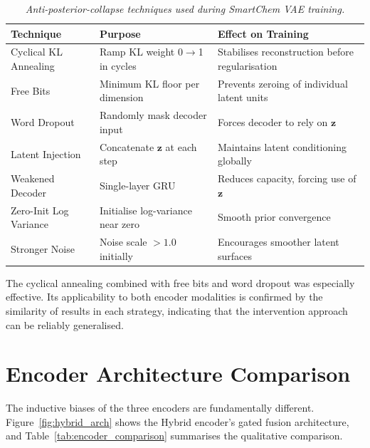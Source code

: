 \documentclass[12pt,a4paper]{report}
\begin{document}
\begin{table}[htbp]
\centering
\small
\caption{\textit{Anti-posterior-collapse techniques used during SmartChem VAE training.}}
\label{tab:anti_collapse}
\begin{tabular}{p{3.4cm}p{4.2cm}p{4.8cm}}
\hline
\textbf{Technique} & \textbf{Purpose} & \textbf{Effect on Training} \\
\hline
Cyclical KL Annealing    & Ramp KL weight 0$\to$1 in cycles
                         & Stabilises reconstruction before regularisation \\[4pt]
Free Bits                & Minimum KL floor per dimension
                         & Prevents zeroing of individual latent units \\[4pt]
Word Dropout             & Randomly mask decoder input
                         & Forces decoder to rely on $\mathbf{z}$ \\[4pt]
Latent Injection         & Concatenate $\mathbf{z}$ at each step
                         & Maintains latent conditioning globally \\[4pt]
Weakened Decoder         & Single-layer GRU
                         & Reduces capacity, forcing use of $\mathbf{z}$ \\[4pt]
Zero-Init Log Variance   & Initialise log-variance near zero
                         & Smooth prior convergence \\[4pt]
Stronger Noise           & Noise scale $> 1.0$ initially
                         & Encourages smoother latent surfaces \\
\hline
\end{tabular}
\end{table}

\normalsize

The cyclical annealing combined with free bits and word dropout was especially effective. Its applicability to both encoder modalities is confirmed by the similarity of results in each strategy, indicating that the intervention approach can be reliably generalised.

\bigskip

\section{Encoder Architecture Comparison}

The inductive biases of the three encoders are fundamentally different. Figure~\ref{fig:hybrid_arch} shows the Hybrid encoder's gated fusion architecture, and Table~\ref{tab:encoder_comparison} summarises the qualitative comparison.
\end{document}
